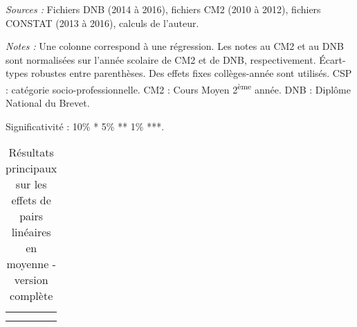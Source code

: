 \documentclass[
]{book}
\begin{document}
\begin{ThreePartTable}
\begin{TableNotes}
\item \textit{Sources :} Fichiers DNB (2014 à 2016), fichiers CM2 (2010 à 2012), fichiers CONSTAT (2013 à 2016), calculs de l'auteur.
\item \textit{Notes :} Une colonne correspond à une régression. Les notes au CM2 et au DNB sont normalisées sur l'année scolaire de CM2 et de DNB, respectivement. Écart-types robustes entre parenthèses. Des effets fixes collèges-année sont utilisés. CSP : catégorie socio-professionnelle. CM2 : Cours Moyen 2\textsuperscript{ème} année. DNB : Diplôme National du Brevet.
\item Significativité : 10\% * 5\% ** 1\% ***.
\end{TableNotes}
\begin{longtable}[t]{llllllllll}
\caption{\label{tab:pemodels0compl}Résultats principaux sur les effets de pairs linéaires en moyenne - version complète}\\
\toprule
{} &  \\
\cmidrule(l{3pt}r{3pt}){2-10}
 &  &  &  \\
\cmidrule(l{3pt}r{3pt}){2-3} \cmidrule(l{3pt}r{3pt}){4-7} \cmidrule(l{3pt}r{3pt}){8-10}

\end{longtable}
\end{ThreePartTable}
\end{document}
